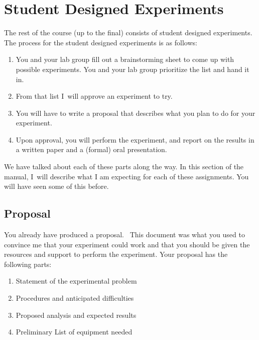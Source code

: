 \chapter{Student Designed Experiments\label{Student Designed Experiments}}
The rest of the course (up to the final) consists of student designed
experiments. The process for the student designed experiments is as follows:

\begin{enumerate}
\item You and your lab group fill out a brainstorming sheet to come up with
possible experiments. You and your lab group prioritize the list and hand it
in.

\item From that list I\ will approve an experiment to try.

\item You will have to write a proposal that describes what you plan to do
for your experiment.

\item Upon approval, you will perform the experiment, and report on the
results in a written paper and a (formal) oral presentation.
\end{enumerate}

We have talked about each of these parts along the way. In this section of
the manual, I\ will describe what I am expecting for each of these
assignments. You will have seen some of this before.

\section{Proposal}

You already have produced a proposal. \ This document was what you used to
convince me that your experiment could work and that you should be given the
resources and support to perform the experiment. Your proposal has the
following parts:

\begin{enumerate}
\item Statement of the experimental problem

\item Procedures and anticipated difficulties

\item Proposed analysis and expected results

\item Preliminary List of equipment needed
\end{enumerate}

